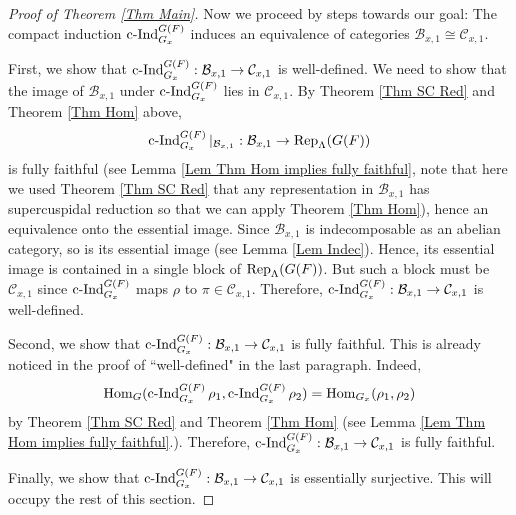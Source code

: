 		\begin{proof}[Proof of Theorem \ref{Thm Main}]
			
			Now we proceed by steps towards our goal: The compact induction $\operatorname{\operatorname{c-Ind}}_{G_x}^{G(F)}$ induces an equivalence of categories $\mathcal{B}_{x,1} \cong \mathcal{C}_{x,1}$. 
			
			First, we show that $\operatorname{\operatorname{c-Ind}}_{G_x}^{G(F)}: \mathcal{B}_{x,1} \to \mathcal{C}_{x,1}$ is well-defined. We need to show that the image of $\mathcal{B}_{x,1}$ under $\operatorname{\operatorname{c-Ind}}_{G_x}^{G(F)}$ lies in $\mathcal{C}_{x,1}$. By Theorem \ref{Thm SC Red} and Theorem \ref{Thm Hom} above, $$\operatorname{\operatorname{c-Ind}}_{G_x}^{G(F)}|_{\mathcal{B}_{x,1}}: \mathcal{B}_{x,1} \to \operatorname{\operatorname{Rep}}_{\Lambda}(G(F))$$
			is fully faithful (see Lemma \ref{Lem Thm Hom implies fully faithful}, note that here we used Theorem \ref{Thm SC Red} that any representation in $\mathcal{B}_{x,1}$ has supercuspidal reduction so that we can apply Theorem \ref{Thm Hom}), hence an equivalence onto the essential image. Since $\mathcal{B}_{x,1}$ is indecomposable as an abelian category, so is its essential image (see Lemma \ref{Lem Indec}). Hence, its essential image is contained in a single block of $\operatorname{\operatorname{Rep}}_{\Lambda}(G(F))$. But such a block must be $\mathcal{C}_{x,1}$ since $\operatorname{\operatorname{c-Ind}}_{G_x}^{G(F)}$ maps $\rho$ to $\pi \in \mathcal{C}_{x,1}$. Therefore, $\operatorname{\operatorname{c-Ind}}_{G_x}^{G(F)}: \mathcal{B}_{x,1} \to \mathcal{C}_{x,1}$ is well-defined.
			
			Second, we show that $\operatorname{\operatorname{c-Ind}}_{G_x}^{G(F)}: \mathcal{B}_{x,1} \to \mathcal{C}_{x,1}$ is fully faithful. This is already noticed in the proof of ``well-defined" in the last paragraph. Indeed, 
			$$\operatorname{\operatorname{Hom}}_G(\operatorname{\operatorname{c-Ind}}_{G_x}^{G(F)}\rho_1, \operatorname{\operatorname{c-Ind}}_{G_x}^{G(F)}\rho_2)=\operatorname{\operatorname{Hom}}_{G_x}(\rho_1, \rho_2)$$
			by Theorem \ref{Thm SC Red} and Theorem \ref{Thm Hom} (see Lemma \ref{Lem Thm Hom implies fully faithful}.). Therefore, $\operatorname{\operatorname{c-Ind}}_{G_x}^{G(F)}: \mathcal{B}_{x,1} \to \mathcal{C}_{x,1}$ is fully faithful.
			
			Finally, we show that $\operatorname{\operatorname{c-Ind}}_{G_x}^{G(F)}: \mathcal{B}_{x,1} \to \mathcal{C}_{x,1}$ is essentially surjective. This will occupy the rest of this section. 
			

\end{proof}
